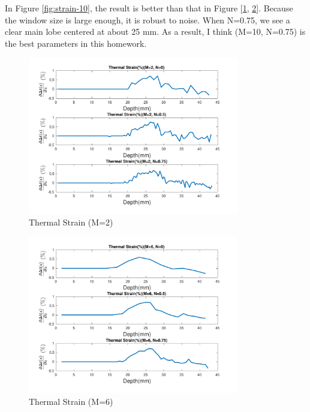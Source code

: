\documentclass{article}
\begin{document}
In Figure \ref{fig:strain-10}, the result is better than that in Figure [\ref{fig:strain-2}, \ref{fig:strain-6}]. Because the 
window size is large enough, it is robust to noise. When N=0.75, we see a clear main lobe centered at about 25 mm. As a result,
I think (M=10, N=0.75) is the best parameters in this homework.


\begin{figure}[H]
    \centering
    \includegraphics[width=0.82\textwidth]{src/strain_2.pdf}
    \caption{Thermal Strain (M=2)}
    \label{fig:strain-2}
\end{figure}
\begin{figure}[H]
    \centering
    \includegraphics[width=0.82\textwidth]{src/strain_6.pdf}
    \caption{Thermal Strain (M=6)}
    \label{fig:strain-6}
\end{figure}
\end{document}
